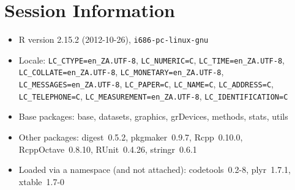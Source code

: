 \documentclass[10pt]{article}
\begin{document}
\section*{Session Information}
\begin{itemize}\raggedright
  \item R version 2.15.2 (2012-10-26), \verb|i686-pc-linux-gnu|
  \item Locale: \verb|LC_CTYPE=en_ZA.UTF-8|, \verb|LC_NUMERIC=C|, \verb|LC_TIME=en_ZA.UTF-8|, \verb|LC_COLLATE=en_ZA.UTF-8|, \verb|LC_MONETARY=en_ZA.UTF-8|, \verb|LC_MESSAGES=en_ZA.UTF-8|, \verb|LC_PAPER=C|, \verb|LC_NAME=C|, \verb|LC_ADDRESS=C|, \verb|LC_TELEPHONE=C|, \verb|LC_MEASUREMENT=en_ZA.UTF-8|, \verb|LC_IDENTIFICATION=C|
  \item Base packages: base, datasets, graphics, grDevices, methods,
    stats, utils
  \item Other packages: digest~0.5.2, pkgmaker~0.9.7, Rcpp~0.10.0,
    RcppOctave~0.8.10, RUnit~0.4.26, stringr~0.6.1
  \item Loaded via a namespace (and not attached): codetools~0.2-8,
    plyr~1.7.1, xtable~1.7-0
\end{itemize}
\end{document}
